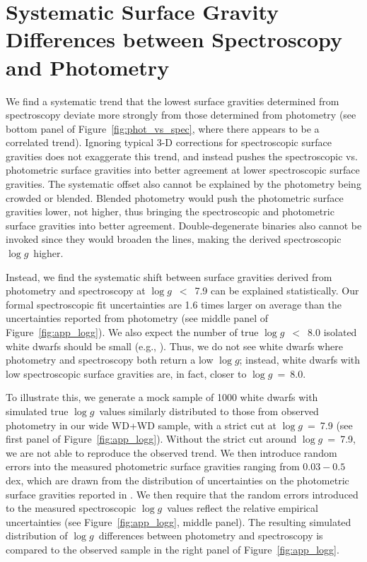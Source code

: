 \documentclass[twocolumn]{aastex631}
\newcommand{\logg}{$\log{g}$}
\begin{document}
\section{Systematic Surface Gravity Differences between Spectroscopy and Photometry}\label{sec:appendix}
We find a systematic trend that the lowest surface gravities determined from spectroscopy deviate more strongly from those determined from photometry (see bottom panel of Figure~\ref{fig:phot_vs_spec}, where there appears to be a correlated trend). Ignoring typical 3-D corrections for spectroscopic surface gravities \citep{2013A&A...559A.104T} does not exaggerate this trend, and instead pushes the spectroscopic vs. photometric surface gravities into better agreement at lower spectroscopic surface gravities. The systematic offset also cannot be explained by the photometry being crowded or blended. Blended photometry would push the photometric surface gravities lower, not higher, thus bringing the spectroscopic and photometric surface gravities into better agreement. Double-degenerate binaries also cannot be invoked since they would broaden the lines, making the derived spectroscopic \logg\ higher.

Instead, we find the systematic shift between surface gravities derived from photometry and spectroscopy at \logg~$<$~7.9 can be explained statistically. Our formal spectroscopic fit uncertainties are 1.6 times larger on average than the uncertainties reported from photometry (see middle panel of Figure~\ref{fig:app_logg}). We also expect the number of true \logg~$<$~8.0 isolated white dwarfs should be small (e.g., \citealt{2024MNRAS.527.8687O}). Thus, we do not see white dwarfs where photometry and spectroscopy both return a low \logg; instead, white dwarfs with low spectroscopic surface gravities are, in fact, closer to \logg~=~8.0.

To illustrate this, we generate a mock sample of 1000 white dwarfs with simulated true \logg\ values similarly distributed to those from observed photometry in our wide WD+WD sample, with a strict cut at \logg~=~7.9 (see first panel of Figure~\ref{fig:app_logg}). Without the strict cut around \logg~=~7.9, we are not able to reproduce the observed trend. We then introduce random errors into the measured photometric surface gravities ranging from $0.03-0.5$\,dex, which are drawn from the distribution of uncertainties on the photometric surface gravities reported in \cite{2022ApJ...934..148H}. We then require that the random errors introduced to the measured spectroscopic \logg\ values reflect the relative empirical uncertainties (see Figure~\ref{fig:app_logg}, middle panel). The resulting simulated distribution of \logg\ differences between photometry and spectroscopy is compared to the observed sample in the right panel of Figure~\ref{fig:app_logg}. 
\end{document}
